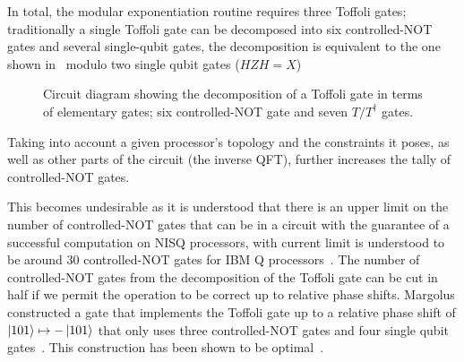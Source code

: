 In total, the modular exponentiation routine requires three Toffoli gates; traditionally a single Toffoli gate can be decomposed into six controlled-NOT gates and several single-qubit gates, the decomposition is equivalent to the one shown in~ modulo two single qubit gates ($HZH = X$)

\begin{figure}[h!]
	\centering
	\caption[Circuit diagram showing the decomposition of a Toffoli gate]{Circuit diagram showing the decomposition of a Toffoli gate in terms of elementary gates; six controlled-NOT gate and seven $T/T^{\dagger}$ gates.}
\end{figure}

\noindent
Taking into account a given processor's topology and the constraints it poses, as well as other parts of the circuit (the inverse \acs{QFT}), further increases the tally of controlled-NOT gates. 

\clearpage
\noindent
This becomes undesirable as it is understood that there is an upper limit on the number of controlled-NOT gates that can be in a circuit with the guarantee of a successful computation on \acs{NISQ} processors, with current limit is understood to be around $30$ controlled-NOT gates for IBM Q processors~\cite{Gwinner_2020,Zhang_2021}. The number of controlled-NOT gates from the decomposition of the Toffoli gate can be cut in half if we permit the operation to be correct up to relative phase shifts. Margolus constructed a gate that implements the Toffoli gate up to a relative phase shift of $\ket{101} \mapsto -\ket{101}$ that only uses three controlled-NOT gates and four single qubit gates~\cite{Marg_1994}. This construction has been shown to be optimal~\cite{Song_2003}. 

